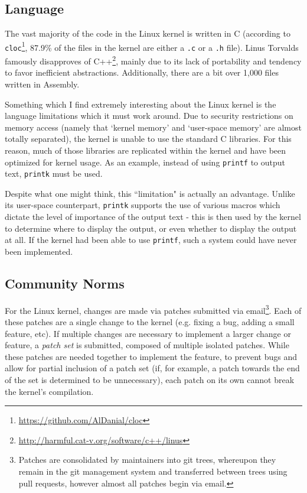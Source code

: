 \documentclass[11pt]{article}
\begin{document}
\subsection{Language}
\label{subsec:kernel_language}

The vast majority of the code in the Linux kernel is written in C (according to \texttt{cloc}\footnote{\url{https://github.com/AlDanial/cloc}}, 87.9\% of the files in the kernel are either a \texttt{.c} or a \texttt{.h} file).  Linus Torvalds famously disapproves of C++\footnote{\url{http://harmful.cat-v.org/software/c++/linus}}, mainly due to its lack of portability and tendency to favor inefficient abstractions.  Additionally, there are a bit over 1,000 files written in Assembly.

Something which I find extremely interesting about the Linux kernel is the language limitations which it must work around.  Due to security restrictions on memory access (namely that `kernel memory' and `user-space memory' are almost totally separated), the kernel is unable to use the standard C libraries.  For this reason, much of those libraries are replicated within the kernel and have been optimized for kernel usage.  As an example, instead of using \texttt{printf} to output text, \texttt{printk} must be used.

Despite what one might think, this ``limitation" is actually an advantage.  Unlike its user-space counterpart, \texttt{printk} supports the use of various macros which dictate the level of importance of the output text - this is then used by the kernel to determine where to display the output, or even whether to display the output at all.  If the kernel had been able to use \texttt{printf}, such a system could have never been implemented.

\subsection{Community Norms}
\label{subsec:kernel_community}

For the Linux kernel, changes are made via patches submitted via email\footnote{Patches are consolidated by maintainers into git trees, whereupon they remain in the git management system and transferred between trees using pull requests, however almost all patches begin via email.}.  Each of these patches are a single change to the kernel (e.g. fixing a bug, adding a small feature, etc).  If multiple changes are necessary to implement a larger change or feature, a \textit{patch set} is submitted, composed of multiple isolated patches.  While these patches are needed together to implement the feature, to prevent bugs and allow for partial inclusion of a patch set (if, for example, a patch towards the end of the set is determined to be unnecessary), each patch on its own cannot break the kernel's compilation.
\end{document}
